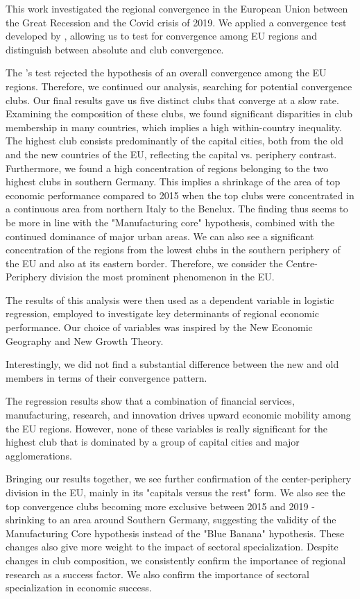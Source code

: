 \documentclass[11pt]{article}
\begin{document}
This work investigated the regional convergence in the European Union between the Great Recession and the Covid crisis of 2019. We applied a convergence test developed by \citet{phillips2009economic}, allowing us to test for convergence among EU regions and distinguish between absolute and club convergence.

The \citeauthor{phillips2009economic}'s test rejected the hypothesis of an overall convergence among the EU regions. Therefore, we continued our analysis, searching for potential convergence clubs. Our final results gave us five distinct clubs 
that converge at a slow rate. Examining the composition of these clubs, we found significant disparities in club membership in many countries, which implies a high within-country inequality. The highest club consists predominantly of the capital cities, both from the old and the new countries of the EU, reflecting the capital vs. periphery contrast. Furthermore, we found a high concentration of regions belonging to the two highest clubs in southern Germany. This implies a shrinkage of the area of top economic performance compared to 2015 when the top clubs were concentrated in a continuous area from northern Italy to the Benelux. The finding thus seems to be more in line with the "Manufacturing core" hypothesis, combined with the continued dominance of major urban areas. We can also see a significant concentration of the regions from the lowest clubs in the southern periphery of the EU and also at its eastern border. Therefore, we consider the Centre-Periphery division the most prominent phenomenon in the EU.

The results of this analysis were then used as a dependent variable in logistic regression, employed to investigate key determinants of regional economic performance. Our choice of variables was inspired by the New Economic Geography and New Growth Theory.


Interestingly, we did not find a substantial difference between the new and old members in terms of their convergence pattern.


The regression results show that a combination of financial services, manufacturing, research, and innovation drives upward economic mobility among the EU regions. However, none of these variables is really significant for the highest club that is dominated by a group of capital cities and major agglomerations.
 
 
Bringing our results together, we see further confirmation of the center-periphery division in the EU, mainly in its "capitals versus the rest" form. We also see the top convergence clubs becoming more exclusive between 2015 and 2019 - shrinking to an area around Southern Germany, suggesting the validity of the Manufacturing Core hypothesis instead of the "Blue Banana" hypothesis. These changes also give more weight to the impact of sectoral specialization. Despite changes in club composition, we consistently confirm the importance of regional research as a success factor. We also confirm the importance of sectoral specialization in economic success. 
\end{document}
